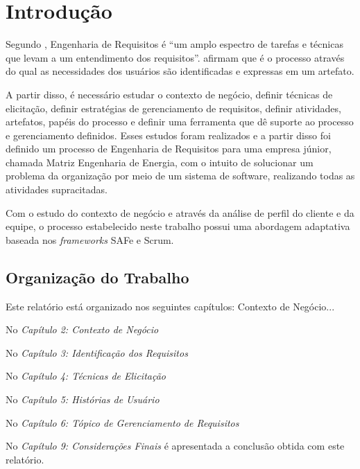 \chapter[Introdução]{Introdução}

Segundo , Engenharia de Requisitos é ``um amplo
espectro de tarefas e técnicas que levam a um entendimento dos requisitos''.
 afirmam que é o processo através do qual as necessidades dos usuários 
são identificadas e expressas em um artefato.

A partir disso, é necessário estudar o contexto de negócio, definir técnicas de elicitação, 
definir estratégias de gerenciamento de requisitos, definir atividades, artefatos, papéis do processo
e definir uma ferramenta que dê suporte ao processo e gerenciamento definidos.
Esses estudos foram realizados e a partir disso foi definido um processo de Engenharia de Requisitos para uma empresa júnior, 
chamada Matriz Engenharia de Energia, com o intuito de solucionar um problema da organização por meio de um sistema de software,
realizando todas as atividades supracitadas.

Com o estudo do contexto de negócio e através da análise de perfil do cliente e da equipe, o processo
estabelecido neste trabalho possui uma abordagem adaptativa baseada nos \textit{frameworks} SAFe e Scrum.

\section{Organização do Trabalho}

Este relatório está organizado nos seguintes capítulos: Contexto de Negócio...

No \textit{Capítulo 2: Contexto de Negócio} 

No \textit{Capítulo 3: Identificação dos Requisitos} 

No \textit{Capítulo 4: Técnicas de Elicitação} 

No \textit{Capítulo 5: Histórias de Usuário} 

No \textit{Capítulo 6: Tópico de Gerenciamento de Requisitos} 

No \textit{Capítulo 9: Considerações Finais} é apresentada a conclusão obtida
com este relatório.